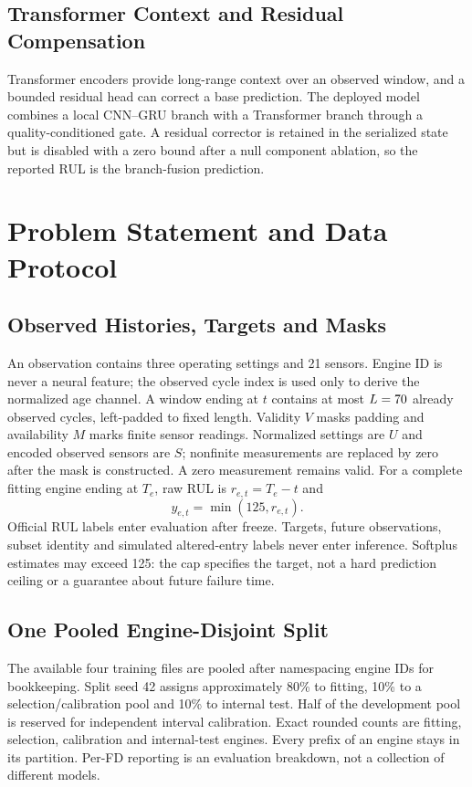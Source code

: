\documentclass[conference]{IEEEtran}
\begin{document}
\subsection{\textbf{Transformer Context and Residual Compensation}}
Transformer encoders provide long-range context over an observed window, and a
bounded residual head can correct a base prediction. The deployed model combines
a local CNN--GRU branch with a Transformer branch through a quality-conditioned
gate. A residual corrector is retained in the serialized state but is disabled
with a zero bound after a null component ablation, so the reported RUL is the
branch-fusion prediction.

\section{\textbf{Problem Statement and Data Protocol}}
\label{sec:problem_statement}
\subsection{\textbf{Observed Histories, Targets and Masks}}
An observation contains three operating settings and 21 sensors. Engine ID is
never a neural feature; the observed cycle index is used only to derive the
normalized age channel. A window ending at $t$
contains at most $L=70$ already observed cycles, left-padded to
fixed length. Validity $V$ masks padding and availability $M$ marks finite sensor
readings. Normalized settings are $U$ and encoded observed sensors are $S$;
nonfinite measurements are replaced by zero after the mask is constructed. A
zero measurement remains valid.
For a complete fitting engine ending at $T_e$, raw RUL is $r_{e,t}=T_e-t$ and
\begin{equation}y_{e,t}=\min(125,r_{e,t}).\label{eq:rul_target}\end{equation}
Official RUL labels enter evaluation after freeze. Targets, future observations,
subset identity and simulated altered-entry labels never enter inference.
Softplus estimates may exceed 125: the cap specifies the target, not a hard
prediction ceiling or a guarantee about future failure time.

\subsection{\textbf{One Pooled Engine-Disjoint Split}}
\CurrentPartitionTable
The available four training files are pooled after namespacing engine IDs for
bookkeeping. Split seed 42 assigns approximately 80\% to fitting, 10\% to a
selection/calibration pool and 10\% to internal test. Half of the development
pool is reserved for independent interval calibration. Exact rounded counts are
\CurrentFitEngines{} fitting, \CurrentSelectionEngines{} selection,
\CurrentCalibrationEngines{} calibration and \CurrentTestEngines{} internal-test
engines. Every prefix of an engine stays in its partition. Per-FD reporting is
an evaluation breakdown, not a collection of different models.
\end{document}
